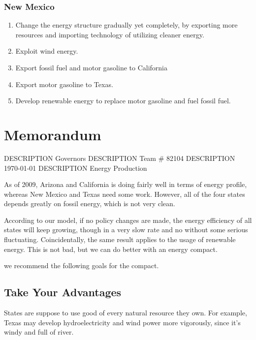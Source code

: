 \documentclass{mcmthesis}
\makeatletter
\newcommand{\DESCRIPTION@original@item}{}
\let\DESCRIPTION@original@item\item
\newcommand*{\DESCRIPTION@envir}{DESCRIPTION}
\newlength{\DESCRIPTION@totalleftmargin}
\newlength{\DESCRIPTION@linewidth}
\newcommand{\DESCRIPTION@makelabel}[1]{\llap{#1}}%
\newcommand{\DESCRIPTION@item}[1][]{%
  \setlength{\@totalleftmargin}%
       {\DESCRIPTION@totalleftmargin+\widthof{\textbf{#1 }}-\leftmargin}%
  \setlength{\linewidth}
       {\DESCRIPTION@linewidth-\widthof{\textbf{#1 }}+\leftmargin}%
  \par\parshape \@ne \@totalleftmargin \linewidth
  \DESCRIPTION@original@item[\textbf{#1}]%
}
\newenvironment{DESCRIPTION}
  {\list{}{\setlength{\labelwidth}{0cm}%
           \let\makelabel\DESCRIPTION@makelabel}%
   \setlength{\DESCRIPTION@totalleftmargin}{\@totalleftmargin}%
   \setlength{\DESCRIPTION@linewidth}{\linewidth}%
   \renewcommand{\item}{\ifx\@currenvir\DESCRIPTION@envir
                           \expandafter\DESCRIPTION@item
                        \else
                           \expandafter\DESCRIPTION@original@item
                        \fi}}
  {\endlist}
\makeatother
\begin{document}
\subsubsection{New Mexico}
\begin{enumerate}
\item Change the energy structure gradually yet completely, by exporting more resources and importing technology of utilizing cleaner energy.
\item Exploit wind energy.
\item Export fossil fuel and motor gasoline to California
\item Export motor gasoline to Texas.
\item Develop renewable energy to replace motor gasoline and fuel fossil fuel.
\end{enumerate}



\newpage

\section{Memorandum}
\begin{DESCRIPTION}
\item [To] Governors
\item [From] Team \# 82104
\item [Date] \today
\item [Subject] Energy Production
\end{DESCRIPTION}

As of 2009, Arizona and California is doing fairly well in terms of energy profile, whereas New Mexico and Texas need some work. However, all of the four states depends greatly on fossil energy, which is not very clean.

According to our model, if no policy changes are made, the energy efficiency of all states will keep growing, though in a very slow rate and no without some serious fluctuating.
Coincidentally, the same result applies to the usage of renewable energy.
This is not bad, but we can do better with an energy compact.

we recommend the following goals for the compact.

\subsection*{Take Your Advantages}
States are suppose to use good of every natural resource they own.
For example, Texas may develop hydroelectricity and wind power more vigorously, since it's windy and full of river.
\end{document}
